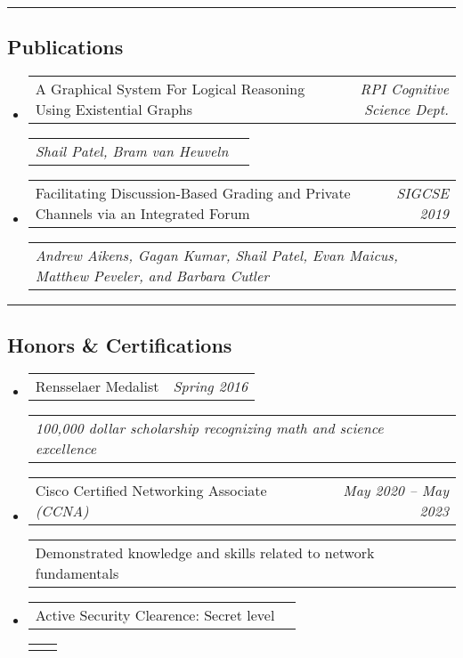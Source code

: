\documentclass[10pt,letterpaper]{article}
\makeatletter
\newcommand{\headerrow}[2]
{\begin{tabular*}{\linewidth}{l@{\extracolsep{\fill}}r}
	#1 &
	#2 \\
\end{tabular*}}
\makeatother
\begin{document}
\hrule
\subsection*{Publications}
\begin{itemize}
	\item
		\headerrow
		{A Graphical System For Logical Reasoning Using Existential Graphs}
		{\emph{RPI Cognitive Science Dept.}}
		\headerrow
		{\emph{Shail Patel, Bram van Heuveln}}
		{}
	\item
		\headerrow
		{Facilitating Discussion-Based Grading and Private Channels via an Integrated Forum}
		{\emph {SIGCSE 2019}}
		\headerrow
		{\emph {Andrew Aikens, Gagan Kumar, Shail Patel, Evan Maicus, Matthew Peveler, and Barbara Cutler}}
		{}
\end{itemize}
\vspace{-0.1em}
\vspace{-0.1em}
\hrule
\vspace{-0.25em}
\subsection*{Honors \& Certifications}
\begin{itemize}
    \item 
        \headerrow
	    {Rensselaer Medalist}
	    {\emph{Spring 2016}}
	    \headerrow
	    {\emph{100,000 dollar scholarship recognizing math and science excellence}}
	    {}
    \item 
        \headerrow
	    {Cisco Certified Networking Associate \emph{(CCNA)}}
	    {\emph{May 2020 -- May 2023}}
	    \headerrow
	    {Demonstrated knowledge and skills related to network fundamentals}
	    {}
    \item 
        \headerrow
	    {Active Security Clearence: Secret level}
	    {}
	    \headerrow
	    {}
	    {}
\end{itemize}
\end{document}
